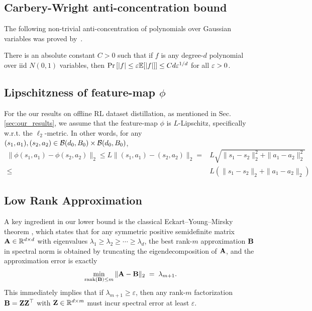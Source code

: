 \subsection{Carbery-Wright anti-concentration bound}\label{sec:carbery}
The following non-trivial anti-concentration of polynomials over Gaussian variables was proved by~\citep{carberywright}.
\begin{theorem}\label{them:Carbery-Wright} There is an absolute constant $C > 0$ such that if $f$ is any degree-$d$ polynomial over iid $N(0,1)$ variables, then $\Pr\left[|f| \leq {\varepsilon} \mathbb{E}[|f|]\right] \leq Cd{\varepsilon}^{1/d}$ for all ${\varepsilon} > 0$.
\end{theorem}


\subsection{Lipschitzness of feature-map $\phi$}
For the our results on offline RL dataset distillation, as mentioned in Sec. \ref{sec:our_results}, we assume that the feature-map $\phi$ is $L$-Lipschitz, specifically w.r.t. the $\ell_2$-metric. In other words, for any $(s_1, a_1), (s_2, a_2) \in \mathcal{B}(d_0, B_0)\times \mathcal{B}(d_0, B_0)$,
\begin{align}
    \|\phi(s_1, a_1) - \phi(s_2, a_2)\|_2 \leq L\|(s_1,a_1) - (s_2,a_2)\|_2 =  & L\sqrt{\|s_1 - s_2\|_2^2 + \|a_1 - a_2\|_2^2} \nonumber \\ \leq & L\left( \|s_1 - s_2\|_2 + \|a_1 - a_2\|_2 \right) \nonumber 
\end{align}



\subsection{Low Rank Approximation}

A key ingredient in our lower bound is the classical Eckart--Young--Mirsky theorem \citep{eckart1936approximation,stewart1993eckart}, which states that for any symmetric positive semidefinite matrix ${\mathbf{A}} \in \mathbb{R}^{d \times d}$ with eigenvalues $\lambda_1 \ge \lambda_2 \ge \cdots \ge \lambda_d$, the best rank-$m$ approximation ${\mathbf{B}}$ in spectral norm is obtained by truncating the eigendecomposition of ${\mathbf{A}}$, and the approximation error is exactly 
\begin{equation}\label{eqn:lora}
  \min_{\operatorname{rank}({\mathbf{B}})\le m} \|{\mathbf{A}}-{\mathbf{B}}\|_2 \;=\; \lambda_{m+1}.
\end{equation}
This immediately implies that if $\lambda_{m+1} \ge \varepsilon$, then any 
rank-$m$ factorization ${\mathbf{B}}={\mathbf{Z}}{\mathbf{Z}}^\top$ with ${\mathbf{Z}} \in \mathbb{R}^{d \times m}$ must incur spectral error at least $\varepsilon$.


